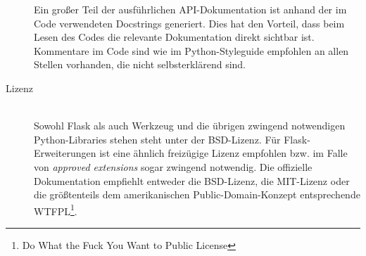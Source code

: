 \begin{description}
Ein großer Teil der ausführlichen API-Dokumentation ist anhand der im Code verwendeten Docstrings
generiert. Dies hat den Vorteil, dass beim Lesen des Codes die relevante Dokumentation direkt
sichtbar ist. Kommentare im Code sind wie im Python-Styleguide empfohlen an allen Stellen vorhanden,
die nicht selbsterklärend sind.


\item[Lizenz] \hfill \\
Sowohl Flask als auch Werkzeug und die übrigen zwingend notwendigen Python-Libraries stehen steht
unter der BSD-Lizenz. Für Flask-Erweiterungen ist eine ähnlich freizügige Lizenz empfohlen bzw. im
Falle von \emph{approved extensions} sogar zwingend notwendig. Die offizielle Dokumentation
empfiehlt entweder die BSD-Lizenz, die MIT-Lizenz oder die größtenteils dem amerikanischen
Public-Domain-Konzept entsprechende WTFPL\footnote{Do What the Fuck You Want to Public License}.
\end{description}

